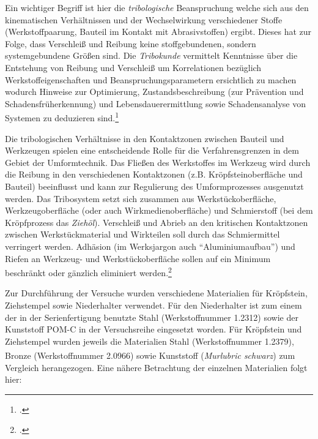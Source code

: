 \documentclass[12pt,a4paper,parskip]{scrartcl}
\begin{document}
Ein wichtiger Begriff ist hier die \emph{tribologische} Beanspruchung welche sich aus den kinematischen Verhältnissen und der Wechselwirkung verschiedener Stoffe (Werkstoffpaarung, Bauteil im Kontakt mit Abrasivstoffen) ergibt. Dieses hat zur Folge, dass Verschleiß und Reibung keine stoffgebundenen, sondern systemgebundene Größen sind. Die \emph{Tribokunde} vermittelt Kenntnisse über die Entstehung von Reibung und Verschleiß um Korrelationen bezüglich Werkstoffeigenschaften und Beanspruchungsparametern ersichtlich zu machen wodurch Hinweise zur Optimierung, Zustandsbeschreibung (zur Prävention und Schadensfrüherkennung) und Lebensdauerermittlung sowie Schadensanalyse von Systemen zu deduzieren sind.\footcite[Vgl.][388-390]{wki}

Die tribologischen Verhältnisse in den Kontaktzonen zwischen Bauteil und Werkzeugen spielen eine entscheidende Rolle für die Verfahrensgrenzen in dem Gebiet der Umformtechnik. Das Fließen des Werkstoffes im Werkzeug wird durch die Reibung in den verschiedenen Kontaktzonen (z.B. Kröpfsteinoberfläche und Bauteil) beeinflusst und kann zur Regulierung des Umformprozesses ausgenutzt werden. Das Tribosystem setzt sich zusammen aus Werkstückoberfläche, Werkzeugoberfläche (oder auch Wirkmedienoberfläche) und Schmierstoff (bei dem Kröpfprozess das \emph{Ziehöl}). Verschleiß und Abrieb  an den kritischen Kontaktzonen zwischen Werkstückmaterial und Wirkteilen soll durch das Schmiermittel verringert werden. Adhäsion (im Werksjargon auch "`Aluminiumaufbau"') und Riefen  an Werkzeug- und Werkstückoberfläche sollen auf ein Minimum beschränkt oder gänzlich eliminiert werden.\footcite[Vgl.][516]{aa}

\newpage


Zur Durchführung der Versuche wurden verschiedene Materialien für Kröpfstein, Ziehstempel sowie Niederhalter verwendet. Für den Niederhalter ist zum einem der in der Serienfertigung benutzte Stahl (Werkstoffnummer 1.2312) sowie der Kunststoff POM-C in der Versuchsreihe eingesetzt worden. Für Kröpfstein und Ziehstempel wurden jeweils die Materialien Stahl (Werkstoffnummer 1.2379), Bronze (Werkstoffnummer 2.0966) sowie Kunststoff (\emph{Murlubric\textsuperscript{\textregistered} schwarz}) zum Vergleich herangezogen. Eine nähere Betrachtung der einzelnen Materialien folgt hier:
\end{document}
